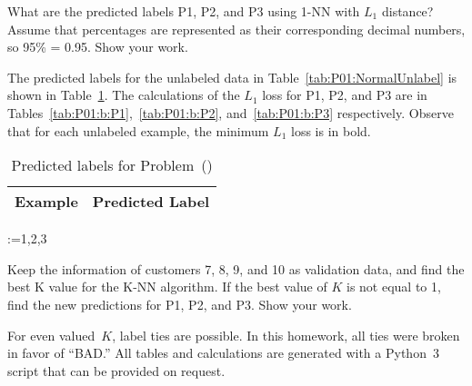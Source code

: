 \FloatBarrier
\begin{subproblem}
  What are the predicted labels P1, P2, and P3 using 1-NN with $L_1$ distance? Assume that percentages are represented as their corresponding decimal numbers, so 95\% = 0.95. Show your work.
\end{subproblem}

The predicted labels for the unlabeled data in Table~\ref{tab:P01:NormalUnlabel} is shown in Table~\ref{tab:P01:b:PredictedLabels}.  The calculations of the $L_1$ loss for P1, P2, and P3 are in Tables~\ref{tab:P01:b:P1},~\ref{tab:P01:b:P2}, and~\ref{tab:P01:b:P3} respectively.  Observe that for each unlabeled example, the minimum $L_1$ loss is in bold.

\begin{table}[h]
  \centering
  \caption{Predicted labels for Problem~()}\label{tab:P01:b:PredictedLabels}
  \begin{tabular}{|c|c|}
    \hline
    Example & Predicted Label \\\hline\hline
    
  \end{tabular}
\end{table}

\@for\id:={1,2,3}

\FloatBarrier
\begin{subproblem}
  Keep the information of customers 7, 8, 9, and 10 as validation data, and find the best K value for the K-NN algorithm. If the best value of $K$ is not equal to 1, find the new predictions for P1, P2, and P3. Show your work.
\end{subproblem}

For even valued~$K$, label ties are possible.  In this homework, all ties were broken in favor of ``BAD.''  All tables and calculations are generated with a Python~3 script that can be provided on request.

